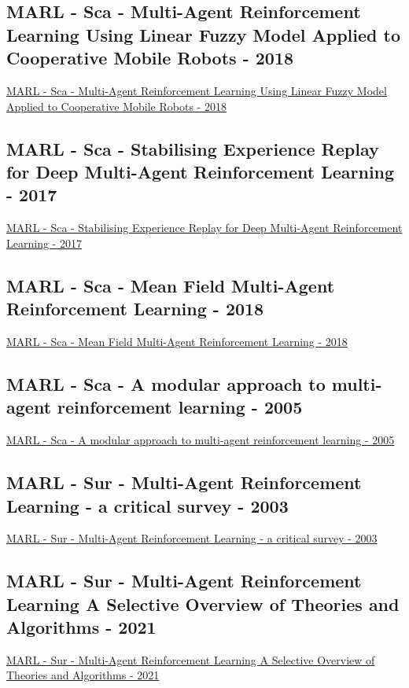 \subsection{MARL - Sca - Multi-Agent Reinforcement Learning Using Linear Fuzzy Model Applied to Cooperative Mobile Robots - 2018}
\href{https://www.mdpi.com/2073-8994/10/10/461}{MARL - Sca - Multi-Agent Reinforcement Learning Using Linear Fuzzy Model Applied to Cooperative Mobile Robots - 2018}

\subsection{MARL - Sca - Stabilising Experience Replay for Deep Multi-Agent Reinforcement Learning - 2017}
\href{http://proceedings.mlr.press/v70/foerster17b.html}{MARL - Sca - Stabilising Experience Replay for Deep Multi-Agent Reinforcement Learning - 2017}

\subsection{MARL - Sca - Mean Field Multi-Agent Reinforcement Learning - 2018}
\href{http://proceedings.mlr.press/v80/yang18d.html}{MARL - Sca - Mean Field Multi-Agent Reinforcement Learning - 2018}

\subsection{MARL - Sca - A modular approach to multi-agent reinforcement learning - 2005}
\href{https://link.springer.com/chapter/10.1007/3-540-62934-3_39}{MARL - Sca - A modular approach to multi-agent reinforcement learning - 2005}

\subsection{MARL - Sur - Multi-Agent Reinforcement Learning - a critical survey - 2003}
\href{http://ai.stanford.edu/people/shoham/www%20papers/MALearning_ACriticalSurvey_2003_0516.pdf}{MARL - Sur - Multi-Agent Reinforcement Learning - a critical survey - 2003}

\subsection{MARL - Sur - Multi-Agent Reinforcement Learning A Selective Overview of Theories and Algorithms - 2021}
\href{https://arxiv.org/abs/1911.10635}{MARL - Sur - Multi-Agent Reinforcement Learning A Selective Overview of Theories and Algorithms - 2021}


